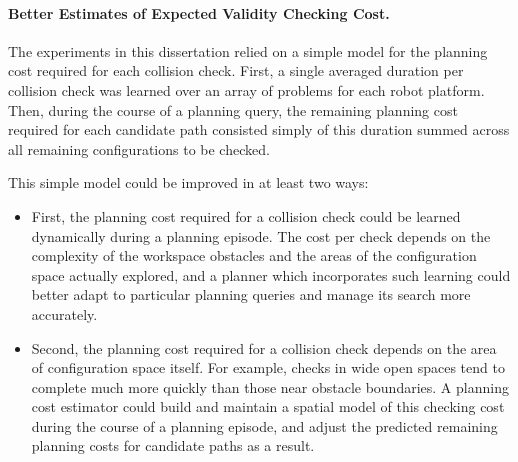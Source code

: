 \paragraph{Better Estimates of Expected Validity Checking Cost.}
The experiments in this dissertation relied on a simple model for
the planning cost required for each collision check.
First,
a single averaged duration per collision check was learned over an array
of problems for each robot platform.
Then, during the course of a planning query,
the remaining planning cost required for each candidate path
consisted simply of this duration summed across all remaining
configurations to be checked.

This simple model could be improved in at least two ways:
\begin{itemize}
\item First, the planning cost required for a collision check could
   be learned dynamically during a planning episode.
   The cost per check depends on the complexity of the workspace
   obstacles and the areas of the configuration space actually
   explored,
   and a planner which incorporates such learning could better adapt to
   particular planning queries and manage its search more accurately.
\item Second, the planning cost required for a collision check depends
   on the area of configuration space itself.
   For example,
   checks in wide open spaces tend to complete much more quickly than
   those near obstacle boundaries.
   A planning cost estimator could build and maintain a spatial model
   of this checking cost during the course of a planning episode,
   and adjust the predicted remaining planning costs for candidate
   paths as a result.
\end{itemize}

